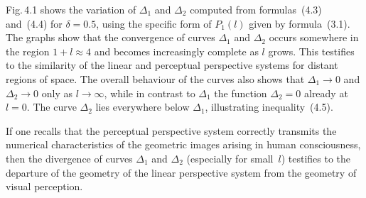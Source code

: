 Fig.\,4.1 shows the variation of $\Delta_1$ and $\Delta_2$ computed from formulas~(4.3)
and~(4.4) for $\delta = 0.5$, using the specific form of $P_1(l)$ given by formula~(3.1).
The graphs show that the convergence of curves $\Delta_1$ and $\Delta_2$ occurs somewhere
in the region $1 + l \approx 4$ and becomes increasingly complete as $l$ grows.  This
testifies to the similarity of the linear and perceptual perspective systems for distant
regions of space.  The overall behaviour of the curves also shows that $\Delta_1 \to 0$ and
$\Delta_2 \to 0$ only as $l \to \infty$, while in contrast to $\Delta_1$ the function
$\Delta_2 = 0$ already at $l = 0$.  The curve $\Delta_2$ lies everywhere below $\Delta_1$,
illustrating inequality~(4.5).


If one recalls that the perceptual perspective system correctly transmits the numerical
characteristics of the geometric images arising in human consciousness, then the divergence
of curves $\Delta_1$ and $\Delta_2$ (especially for small~$l$) testifies to the departure of
the geometry of the linear perspective system from the geometry of visual perception.
